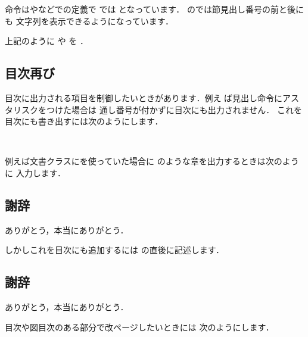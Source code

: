 命令はやなどでの定義で
では となっています．
のでは節見出し番号の前と後にも
文字列を表示できるようになっています．

\begin{InTeX}
\renewcommand{presectionname}{第}
\renewcommand{postsectionname}{節}
\end{InTeX}

上記のように や を
．

\section{目次再び}
目次に出力される項目を制御したいときがあります．例え
ば見出し命令にアスタリスクをつけた場合は
通し番号が付かずに目次にも出力されません．
これを目次にも書き出すには次のようにします．

\begin{InTeX}
\end{InTeX}

\begin{Syntax}
\\
\end{Syntax}
例えば文書クラスにを使っていた場合に
のような章を出力するときは次のように
入力します．

\begin{InTeX}
\chapter*{謝辞}
ありがとう，本当にありがとう．
\end{InTeX}

しかしこれを目次にも追加するには  の直後に記述します．

\begin{InTeX}
\chapter*{謝辞}
ありがとう，本当にありがとう．
\end{InTeX}

目次や図目次のある部分で改ページしたいときには
次のようにします．

\begin{InTeX}
\end{InTeX}


